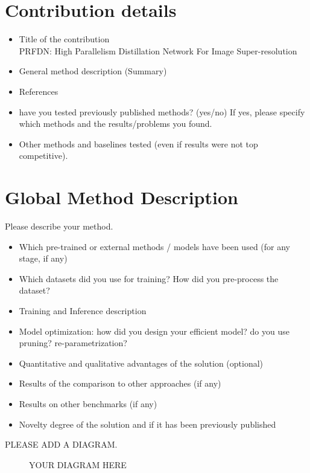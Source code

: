 \documentclass{article}
\begin{document}
\section{Contribution details}

\begin{itemize}
\item Title of the contribution\\PRFDN: High Parallelism Distillation Network For Image Super-resolution
\item General method description (Summary)
\item References                                               
\item have you tested previously published methods? (yes/no) If yes, please specify which methods and the results/problems you found.
\item Other methods and baselines tested (even if results were not top competitive).
\end{itemize}

\section{Global Method Description}
Please describe your method.

\begin{itemize}
\item Which pre-trained or external methods / models have been used (for any stage, if any) 
\item Which datasets did you use for training? How did you pre-process the dataset?
\item Training and Inference description
\item Model optimization: how did you design your efficient model? do you use pruning? re-parametrization?
\item Quantitative and qualitative advantages of the solution (optional)
\item Results of the comparison to other approaches (if any)
\item Results on other benchmarks (if any)
\item Novelty degree of the solution and if it has been previously published
\end{itemize}


PLEASE ADD A DIAGRAM.
\begin{figure}
    \centering
    \framebox{}
    \caption{YOUR DIAGRAM HERE}
    \label{fig:my_diagram}
\end{figure}
\end{document}

